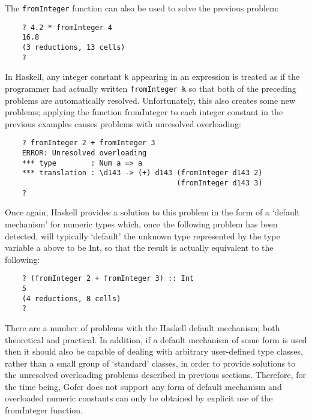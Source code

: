 The \verb"fromInteger" function  can  also  be  used  to  solve  the  previous
problem:
\begin{verbatim}
    ? 4.2 * fromInteger 4
    16.8
    (3 reductions, 13 cells)
    ?
\end{verbatim}
In Haskell, any integer  constant  \verb"k"  appearing  in  an  expression  is
treated as if the programmer had actually written  \verb"fromInteger k"  so
that  both  of  the  preceding  problems  are  automatically  resolved.
Unfortunately, this  also  creates  some  new  problems;  applying  the
function fromInteger to each  integer  constant  in  the previous  examples
causes problems with unresolved overloading:
\begin{verbatim}
    ? fromInteger 2 + fromInteger 3
    ERROR: Unresolved overloading
    *** type        : Num a => a
    *** translation : \d143 -> (+) d143 (fromInteger d143 2)
                                        (fromInteger d143 3)
    ?
\end{verbatim}
Once again, Haskell provides a solution to this problem in the form  of
a `default mechanism' for  numeric  types  which,  once  the  following
problem has been detected, will typically `default'  the  unknown  type
represented by the type variable a above to be Int, so that the  result
is actually equivalent to the following:
\begin{verbatim}
    ? (fromInteger 2 + fromInteger 3) :: Int
    5
    (4 reductions, 8 cells)
    ?
\end{verbatim}
There are a number of problems with the Haskell default mechanism; both
theoretical and practical.  In addition, if a default mechanism of some
form is used then it should also be capable of dealing  with  arbitrary
user-defined type classes, rather than  a  small  group  of  `standard'
classes, in order to provide solutions to  the  unresolved  overloading
problems described in  previous  sections.   Therefore,  for  the  time
being, Gofer does  not  support  any  form  of  default  mechanism  and
overloaded numeric constants can only be obtained by  explicit  use  of
the fromInteger function.


